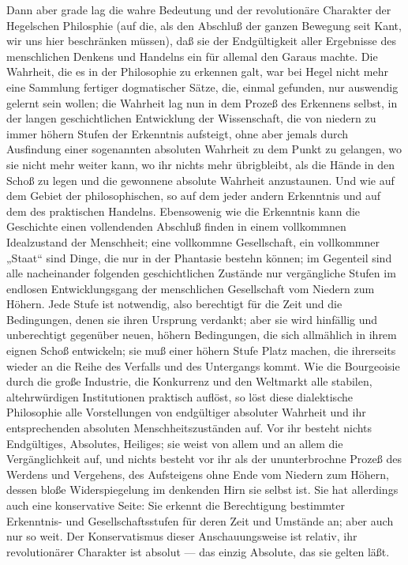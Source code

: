 Dann aber grade lag die wahre Bedeutung und der revolutionäre
Charakter der Hegelschen Philosphie (auf die, als den Abschluß der
ganzen Bewegung seit Kant, wir uns hier beschränken müssen), daß sie der
Endgültigkeit aller Ergebnisse des menschlichen Denkens und Handelns ein
für allemal den Garaus machte. Die Wahrheit, die es in der Philosophie
zu erkennen galt, war bei Hegel nicht mehr eine Sammlung fertiger
dogmatischer Sätze, die, einmal gefunden, nur auswendig gelernt sein
wollen; die Wahrheit lag nun in dem Prozeß des Erkennens selbst, in der
langen geschichtlichen Entwicklung der Wissenschaft, die von niedern zu
immer höhern Stufen der Erkenntnis aufsteigt, ohne aber jemals durch
Ausfindung einer sogenannten absoluten Wahrheit zu dem Punkt zu
gelangen, wo sie nicht mehr weiter kann, wo ihr nichts mehr übrigbleibt,
als die Hände in den Schoß zu legen und die gewonnene absolute Wahrheit
anzustaunen. Und wie auf dem Gebiet der philosophischen, so auf dem
jeder andern Erkenntnis und auf dem des praktischen Handelns.
Ebensowenig wie die Erkenntnis kann die Geschichte einen vollendenden
Abschluß finden in einem vollkommnen Idealzustand der Menschheit; eine
vollkommne Gesellschaft, ein vollkommner „Staat`` sind Dinge, die nur in
der Phantasie bestehn können; im Gegenteil sind alle nacheinander
folgenden geschichtlichen Zustände nur vergängliche Stufen im endlosen
Entwicklungsgang der menschlichen Gesellschaft vom Niedern zum Höhern.
Jede Stufe ist notwendig, also berechtigt für die Zeit und die
Bedingungen, denen sie ihren Ursprung verdankt; aber sie wird hinfällig
und unberechtigt gegenüber neuen, höhern Bedingungen, die sich
allmählich in ihrem eignen Schoß entwickeln; sie muß einer höhern Stufe
Platz machen, die ihrerseits wieder an die Reihe des Verfalls und des
Untergangs kommt. Wie die Bourgeoisie durch die große Industrie, die
Konkurrenz und den Weltmarkt alle stabilen, altehrwürdigen Institutionen
praktisch auflöst, so löst diese dialektische Philosophie alle
Vorstellungen von endgültiger absoluter Wahrheit und ihr entsprechenden
absoluten Menschheitszuständen auf. Vor ihr besteht nichts Endgültiges,
Absolutes, Heiliges; sie weist von allem und an allem die
Vergänglichkeit auf, und nichts besteht vor ihr als der ununterbrochne
Prozeß des Werdens und Vergehens, des Aufsteigens ohne Ende vom Niedern
zum Höhern, dessen bloße Widerspiegelung im denkenden Hirn sie selbst
ist. Sie hat allerdings auch eine konservative Seite: Sie erkennt die
Berechtigung bestimmter Erkenntnis- und Gesellschaftsstufen für deren
Zeit und Umstände an; aber auch nur so weit. Der Konservatismus dieser
Anschauungsweise ist relativ, ihr revolutionärer Charakter ist absolut ---
das einzig Absolute, das sie gelten läßt.

